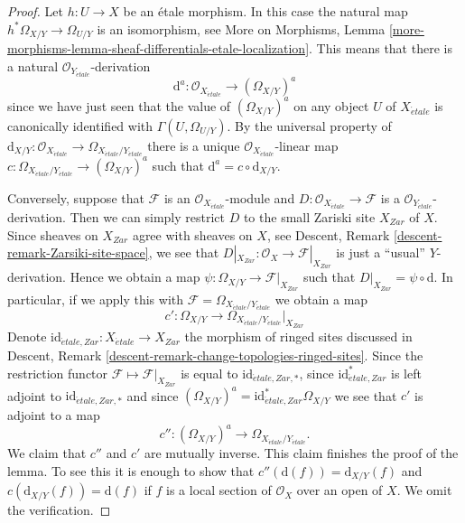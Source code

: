 \begin{proof}
Let $h : U \to X$ be an \'etale morphism. In this case the natural map
$h^*\Omega_{X/Y} \to \Omega_{U/Y}$ is an isomorphism, see
More on Morphisms,
Lemma \ref{more-morphisms-lemma-sheaf-differentials-etale-localization}.
This means that there is a natural $\mathcal{O}_{Y_{\acute{e}tale}}$-derivation
$$
\text{d}^a : \mathcal{O}_{X_{\acute{e}tale}} \longrightarrow (\Omega_{X/Y})^a
$$
since we have just seen that the value of $(\Omega_{X/Y})^a$ on any object
$U$ of $X_{\acute{e}tale}$ is canonically identified with
$\Gamma(U, \Omega_{U/Y})$. By the universal property of
$\text{d}_{X/Y} :
\mathcal{O}_{X_{\acute{e}tale}}
\to
\Omega_{X_{\acute{e}tale}/Y_{\acute{e}tale}}$
there is a unique $\mathcal{O}_{X_{\acute{e}tale}}$-linear map
$c : \Omega_{X_{\acute{e}tale}/Y_{\acute{e}tale}} \to (\Omega_{X/Y})^a$
such that
$\text{d}^a = c \circ \text{d}_{X/Y}$.

\medskip\noindent
Conversely, suppose that $\mathcal{F}$ is an
$\mathcal{O}_{X_{\acute{e}tale}}$-module
and $D : \mathcal{O}_{X_{\acute{e}tale}} \to \mathcal{F}$ is a
$\mathcal{O}_{Y_{\acute{e}tale}}$-derivation. Then we can simply restrict
$D$ to the small Zariski site $X_{Zar}$ of $X$. Since sheaves on $X_{Zar}$
agree with sheaves on $X$, see
Descent, Remark \ref{descent-remark-Zarsiki-site-space},
we see that $D|_{X_{Zar}} : \mathcal{O}_X \to \mathcal{F}|_{X_{Zar}}$
is just a ``usual'' $Y$-derivation. Hence we obtain a map
$\psi : \Omega_{X/Y} \longrightarrow \mathcal{F}|_{X_{Zar}}$
such that $D|_{X_{Zar}} = \psi \circ \text{d}$. In particular, if we
apply this with $\mathcal{F} = \Omega_{X_{\acute{e}tale}/Y_{\acute{e}tale}}$
we obtain a map
$$
c' :
\Omega_{X/Y}
\longrightarrow
\Omega_{X_{\acute{e}tale}/Y_{\acute{e}tale}}|_{X_{Zar}}
$$
Denote $\text{id}_{\acute{e}tale, Zar} : X_{\acute{e}tale} \to X_{Zar}$
the morphism of ringed sites discussed in
Descent, Remark \ref{descent-remark-change-topologies-ringed-sites}.
Since the restriction functor $\mathcal{F} \mapsto \mathcal{F}|_{X_{Zar}}$
is equal to $\text{id}_{\acute{e}tale, Zar, *}$, since
$\text{id}_{\acute{e}tale, Zar}^*$ is left adjoint to
$\text{id}_{\acute{e}tale, Zar, *}$ and since
$(\Omega_{X/Y})^a = \text{id}_{\acute{e}tale, Zar}^*\Omega_{X/Y}$
we see that $c'$ is adjoint to a map
$$
c'' :
(\Omega_{X/Y})^a
\longrightarrow
\Omega_{X_{\acute{e}tale}/Y_{\acute{e}tale}}.
$$
We claim that $c''$ and $c'$ are mutually inverse.
This claim finishes the proof of the lemma.
To see this it is enough to show that $c''(\text{d}(f)) = \text{d}_{X/Y}(f)$
and $c(\text{d}_{X/Y}(f)) = \text{d}(f)$ if $f$ is a local section of
$\mathcal{O}_X$ over an open of $X$. We omit the verification.
\end{proof}


